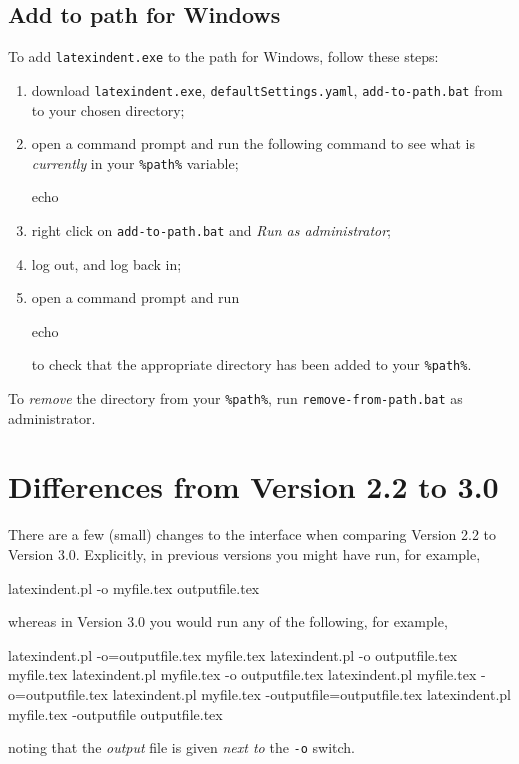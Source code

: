 	\subsection{Add to path for Windows}
		To add \texttt{latexindent.exe} to the path for Windows, follow these steps:
		\begin{enumerate}
			\item download  \texttt{latexindent.exe}, \texttt{defaultSettings.yaml},  \texttt{add-to-path.bat}
			      from \cite{latexindent-home} to your chosen directory;
			\item open a command prompt and run the following command to see what is \emph{currently} in your \lstinline!%path%! variable;
			      \begin{dosprompt}
echo %
          \end{dosprompt}
			\item right click on \texttt{add-to-path.bat} and \emph{Run as administrator};
			\item log out, and log back in;
			\item open a command prompt and run
			      \begin{dosprompt}
echo %
          \end{dosprompt}
			      to check that the appropriate directory has been added to your \lstinline!%path%!.
		\end{enumerate}
		To \emph{remove} the directory from your \lstinline!%path%!, run \texttt{remove-from-path.bat} as administrator.

	\section{Differences from Version 2.2 to 3.0}\label{app:differences}
	 There are a few (small) changes to the interface when comparing Version 2.2 to Version 3.0.
	 Explicitly, in previous versions you might have run, for example,
	 \begin{commandshell}
latexindent.pl -o myfile.tex outputfile.tex
 \end{commandshell}
	 whereas in Version 3.0 you would run any of the following, for example,
	 \begin{commandshell}
latexindent.pl -o=outputfile.tex myfile.tex
latexindent.pl -o outputfile.tex myfile.tex
latexindent.pl myfile.tex -o outputfile.tex 
latexindent.pl myfile.tex -o=outputfile.tex 
latexindent.pl myfile.tex -outputfile=outputfile.tex 
latexindent.pl myfile.tex -outputfile outputfile.tex 
 \end{commandshell}
	 noting that the \emph{output} file is given \emph{next to} the \texttt{-o} switch.

